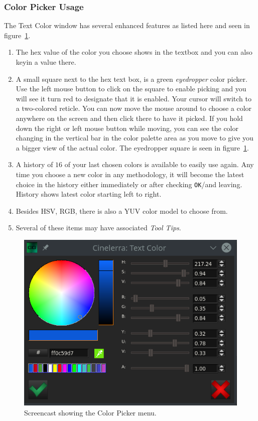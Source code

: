 \subsubsection*{Color Picker Usage}%
\label{ssub:color_picker_usage}

The Text Color window has several enhanced features as listed here and seen in figure~\ref{fig:title04}.

\begin{enumerate}
    \item The hex value of the color you choose shows in the textbox and you can also keyin a value there.
    \item A small square next to the hex text box, is a green \textit{eyedropper} color picker. Use the left mouse button to click on the square to enable picking and you will see it turn red to designate that it is enabled. Your cursor will switch to a two-colored reticle. You can now move the mouse around to choose a color anywhere on the screen and then click there to have it picked. If you hold down the right or left mouse button while moving, you can see the color changing in the vertical bar in the color palette area as you move to give you a bigger view of the actual color. The eyedropper square is seen in figure~\ref{fig:title04}.
    \item A history of $16$ of your last chosen colors is available to easily use again. Any time you choose a new color in any methodology, it will become the latest choice in the history either immediately or after checking \texttt{OK}/and leaving. History shows latest color starting left to right.
    \item Besides HSV, RGB, there is also a YUV color model to choose from.
    \item Several of these items may have associated \textit{Tool Tips}.
\end{enumerate}

\begin{figure}[hbtp]
    \centering
    \includegraphics[width=0.5\linewidth]{images/title04.png}
    \caption{Screencast showing the Color Picker menu.}
    \label{fig:title04}
\end{figure}

